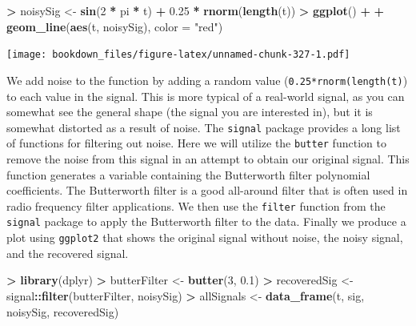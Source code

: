 \documentclass[
]{krantz}
\makeatletter
\newenvironment{Shaded}{\begin{snugshade}}{\end{snugshade}}
\newcommand{\DataTypeTok}[1]{\textcolor[rgb]{0.27,0.27,0.27}{#1}}
\newcommand{\DecValTok}[1]{\textcolor[rgb]{0.06,0.06,0.06}{#1}}
\newcommand{\FloatTok}[1]{\textcolor[rgb]{0.06,0.06,0.06}{#1}}
\newcommand{\KeywordTok}[1]{\textcolor[rgb]{0.27,0.27,0.27}{\textbf{#1}}}
\newcommand{\NormalTok}[1]{#1}
\newcommand{\OperatorTok}[1]{\textcolor[rgb]{0.43,0.43,0.43}{\textbf{#1}}}
\newcommand{\StringTok}[1]{\textcolor[rgb]{0.5,0.5,0.5}{#1}}
\newenvironment{kframe}{%
\medskip{}
\setlength{\fboxsep}{.8em}
 \def\at@end@of@kframe{}%
 \ifinner\ifhmode%
  \def\at@end@of@kframe{\end{minipage}}%
  \begin{minipage}{\columnwidth}%
 \fi\fi%
 \def\FrameCommand##1{\hskip\@totalleftmargin \hskip-\fboxsep
 \colorbox{shadecolor}{##1}\hskip-\fboxsep
     \hskip-\linewidth \hskip-\@totalleftmargin \hskip\columnwidth}%
 \MakeFramed {\advance\hsize-\width
   \@totalleftmargin\z@ \linewidth\hsize
   \@setminipage}}%
 {\par\unskip\endMakeFramed%
 \at@end@of@kframe}
\renewenvironment{Shaded}{\begin{kframe}}{\end{kframe}}
\makeatother
\begin{document}
\begin{Shaded}
\begin{Highlighting}[]
\OperatorTok{\textgreater{}}\StringTok{ }\NormalTok{noisySig \textless{}{-}}\StringTok{ }\KeywordTok{sin}\NormalTok{(}\DecValTok{2} \OperatorTok{*}\StringTok{ }\NormalTok{pi }\OperatorTok{*}\StringTok{ }\NormalTok{t) }\OperatorTok{+}\StringTok{ }\FloatTok{0.25} \OperatorTok{*}\StringTok{ }\KeywordTok{rnorm}\NormalTok{(}\KeywordTok{length}\NormalTok{(t))}
\OperatorTok{\textgreater{}}\StringTok{ }\KeywordTok{ggplot}\NormalTok{() }\OperatorTok{+}\StringTok{ }
\OperatorTok{+}\StringTok{   }\KeywordTok{geom\_line}\NormalTok{(}\KeywordTok{aes}\NormalTok{(t, noisySig), }\DataTypeTok{color =} \StringTok{"red"}\NormalTok{)}
\end{Highlighting}
\end{Shaded}

\texttt{[image: bookdown\_files/figure-latex/unnamed-chunk-327-1.pdf]}

We add noise to the function by adding a random value (\texttt{0.25*rnorm(length(t)}) to each value in the signal. This is more typical of a real-world signal, as you can somewhat see the general shape (the signal you are interested in), but it is somewhat distorted as a result of noise. The \texttt{signal} package provides a long list of functions for filtering out noise. Here we will utilize the \texttt{butter} function to remove the noise from this signal in an attempt to obtain our original signal. This function generates a variable containing the Butterworth filter polynomial coefficients. The Butterworth filter is a good all-around filter that is often used in radio frequency filter applications. We then use the \texttt{filter} function from the \texttt{signal} package to apply the Butterworth filter to the data. Finally we produce a plot using \texttt{ggplot2} that shows the original signal without noise, the noisy signal, and the recovered signal.

\begin{Shaded}
\begin{Highlighting}[]
\OperatorTok{\textgreater{}}\StringTok{ }\KeywordTok{library}\NormalTok{(dplyr)}
\OperatorTok{\textgreater{}}\StringTok{ }\NormalTok{butterFilter \textless{}{-}}\StringTok{ }\KeywordTok{butter}\NormalTok{(}\DecValTok{3}\NormalTok{, }\FloatTok{0.1}\NormalTok{)}
\OperatorTok{\textgreater{}}\StringTok{ }\NormalTok{recoveredSig \textless{}{-}}\StringTok{ }\NormalTok{signal}\OperatorTok{::}\KeywordTok{filter}\NormalTok{(butterFilter, noisySig)}
\OperatorTok{\textgreater{}}\StringTok{ }\NormalTok{allSignals \textless{}{-}}\StringTok{ }\KeywordTok{data\_frame}\NormalTok{(t, sig, noisySig, recoveredSig)}
\end{Highlighting}
\end{Shaded}
\end{document}
